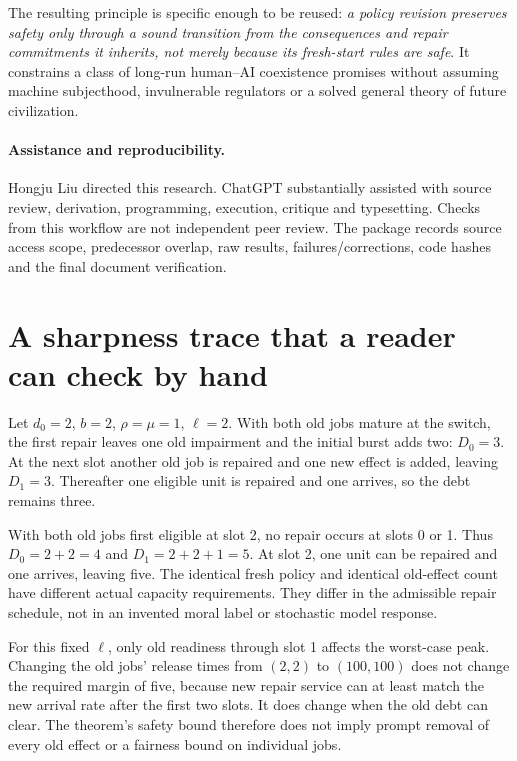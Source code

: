 The resulting principle is specific enough to be reused: \emph{a policy revision preserves safety only through a sound transition from the consequences and repair commitments it inherits, not merely because its fresh-start rules are safe}. It constrains a class of long-run human--AI coexistence promises without assuming machine subjecthood, invulnerable regulators or a solved general theory of future civilization.

\paragraph{Assistance and reproducibility.}
Hongju Liu directed this research. ChatGPT substantially assisted with source review, derivation, programming, execution, critique and typesetting. Checks from this workflow are not independent peer review. The package records source access scope, predecessor overlap, raw results, failures/corrections, code hashes and the final document verification.

\appendix
\section{A sharpness trace that a reader can check by hand}
Let $d_0=2$, $b=2$, $\rho=\mu=1$, $\ell=2$. With both old jobs mature at the switch, the first repair leaves one old impairment and the initial burst adds two: $D_0=3$. At the next slot another old job is repaired and one new effect is added, leaving $D_1=3$. Thereafter one eligible unit is repaired and one arrives, so the debt remains three.

With both old jobs first eligible at slot 2, no repair occurs at slots 0 or 1. Thus $D_0=2+2=4$ and $D_1=2+2+1=5$. At slot 2, one unit can be repaired and one arrives, leaving five. The identical fresh policy and identical old-effect count have different actual capacity requirements. They differ in the admissible repair schedule, not in an invented moral label or stochastic model response.

For this fixed $\ell$, only old readiness through slot 1 affects the worst-case peak. Changing the old jobs' release times from $(2,2)$ to $(100,100)$ does not change the required margin of five, because new repair service can at least match the new arrival rate after the first two slots. It does change when the old debt can clear. The theorem's safety bound therefore does not imply prompt removal of every old effect or a fairness bound on individual jobs.

